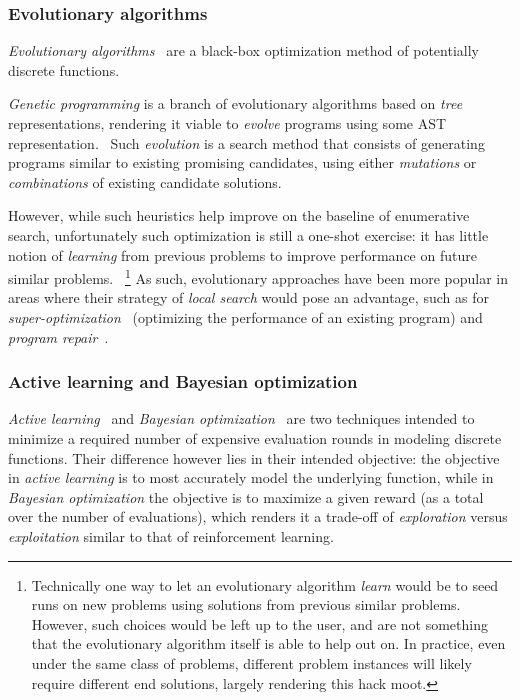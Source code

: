 \documentclass{article}
\begin{document}
\subsubsection{Evolutionary algorithms}

\emph{Evolutionary algorithms}~\citep{eiben2003introduction} are a black-box optimization method of potentially discrete functions.

\emph{Genetic programming} is a branch of evolutionary algorithms based on \emph{tree} representations,
rendering it viable to \emph{evolve} programs using some AST representation.~\citep{koza1994genetic}
Such \emph{evolution} is a search method that consists of generating programs similar to existing promising candidates, using either \emph{mutations} or \emph{combinations} of existing candidate solutions.

However, while such heuristics help improve on the baseline of enumerative search,
unfortunately such optimization is still a one-shot exercise:
it has little notion of \emph{learning} from previous problems to improve performance on future similar problems.%
~\footnote{
    Technically one way to let an evolutionary algorithm \emph{learn} would be to seed runs on new problems using solutions from previous similar problems.
    However, such choices would be left up to the user,
    and are not something that the evolutionary algorithm itself is able to help out on.
    In practice, even under the same class of problems,
    different problem instances will likely require different end solutions,
    largely rendering this hack moot.
}
As such, evolutionary approaches have been more popular in areas where their strategy of \emph{local search} would pose an advantage, such as for \emph{super-optimization}~\citep{schkufza2016stochastic} (optimizing the performance of an existing program) and \emph{program repair}~\citep{weimer2009automatically,forrest2009genetic}.

\subsubsection{Active learning and Bayesian optimization}

\emph{Active learning}~\citep{settles2009active} and
\emph{Bayesian optimization}~\citep{mockus2012bayesian}
are two techniques intended to minimize a required number of
expensive evaluation rounds in modeling discrete functions.
Their difference however lies in their intended objective:
the objective in \emph{active learning} is to most accurately
model the underlying function, while in
\emph{Bayesian optimization} the objective is to maximize
a given reward (as a total over the number of evaluations),
which renders it a trade-off of \emph{exploration} versus
\emph{exploitation} similar to that of reinforcement learning.
\end{document}
